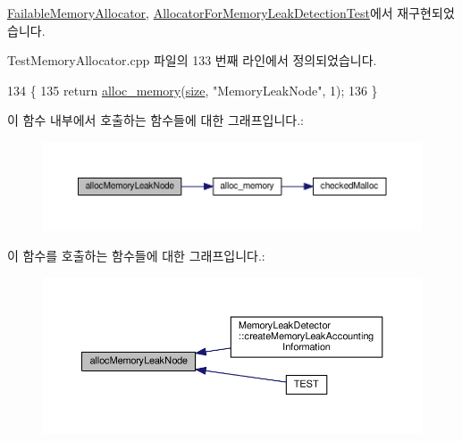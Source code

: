 \hyperlink{class_failable_memory_allocator_a1a786ad58b46528e82235a14fa667c1d}{Failable\+Memory\+Allocator}, \hyperlink{class_allocator_for_memory_leak_detection_test_aac775b3e19729b16bad56a45ddfcf01c}{Allocator\+For\+Memory\+Leak\+Detection\+Test}에서 재구현되었습니다.



Test\+Memory\+Allocator.\+cpp 파일의 133 번째 라인에서 정의되었습니다.


\begin{DoxyCode}
134 \{
135     \textcolor{keywordflow}{return} \hyperlink{class_test_memory_allocator_a2ebbde51a1d514c74e9e2a09a21b0624}{alloc\_memory}(\hyperlink{gst__avb__playbin_8c_a439227feff9d7f55384e8780cfc2eb82}{size}, \textcolor{stringliteral}{"MemoryLeakNode"}, 1);
136 \}
\end{DoxyCode}


이 함수 내부에서 호출하는 함수들에 대한 그래프입니다.\+:
\nopagebreak
\begin{figure}[H]
\begin{center}
\leavevmode
\includegraphics[width=350pt]{class_test_memory_allocator_a1a786ad58b46528e82235a14fa667c1d_cgraph}
\end{center}
\end{figure}




이 함수를 호출하는 함수들에 대한 그래프입니다.\+:
\nopagebreak
\begin{figure}[H]
\begin{center}
\leavevmode
\includegraphics[width=350pt]{class_test_memory_allocator_a1a786ad58b46528e82235a14fa667c1d_icgraph}
\end{center}
\end{figure}


